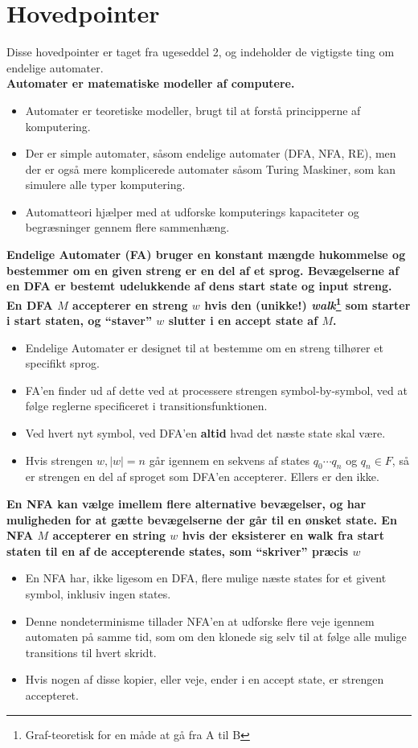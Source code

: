 \newpage
\section{Hovedpointer}%
\label{sec:hovedpointer}

Disse hovedpointer er taget fra ugeseddel 2, og indeholder de vigtigste ting om endelige automater.\\
\noindent
\textbf{Automater er matematiske modeller af computere.}
\begin{itemize}
	\item Automater er teoretiske modeller, brugt til at forstå principperne af komputering.
	\item Der er simple automater, såsom endelige automater (DFA, NFA, RE), men der er også mere komplicerede automater såsom Turing Maskiner, som kan simulere alle typer komputering.
	\item Automatteori hjælper med at udforske komputerings kapaciteter og begræsninger gennem flere sammenhæng.
\end{itemize}
\noindent
\textbf{Endelige Automater (FA) bruger en konstant mængde hukommelse og bestemmer om en given streng er en del af et sprog. Bevægelserne af en DFA er bestemt udelukkende af dens start state og input streng. En DFA $M$ accepterer en streng $w$ hvis den (unikke!) \textit{walk}\footnote{Graf-teoretisk for en måde at gå fra A til B} som starter i start staten, og ``staver'' $w$ slutter i en accept state af $M$.}
\begin{itemize}
	\item Endelige Automater er designet til at bestemme om en streng tilhører et specifikt sprog.
	\item FA'en finder ud af dette ved at processere strengen symbol-by-symbol, ved at følge reglerne specificeret i transitionsfunktionen.
	\item Ved hvert nyt symbol, ved DFA'en \textbf{altid} hvad det næste state skal være.
	\item Hvis strengen $w, |w| = n$ går igennem en sekvens af states $q_{0} \cdots q_{n}$ og $q_{n} \in F$, så er strengen en del af sproget som DFA'en accepterer. Ellers er den ikke.
\end{itemize}
\noindent
\textbf{En NFA kan vælge imellem flere alternative bevægelser, og har muligheden for at gætte bevægelserne der går til en ønsket state. En NFA $M$ accepterer en string $w$ hvis der eksisterer en walk fra start staten til en af de accepterende states, som ``skriver'' præcis $w$}
\begin{itemize}
	\item En NFA har, ikke ligesom en DFA, flere mulige næste states for et givent symbol, inklusiv ingen states.
	\item Denne nondeterminisme tillader NFA'en at udforske flere veje igennem automaten på samme tid, som om den klonede sig selv til at følge alle mulige transitions til hvert skridt.
	\item Hvis nogen af disse kopier, eller veje, ender i en accept state, er strengen accepteret.
\end{itemize}
